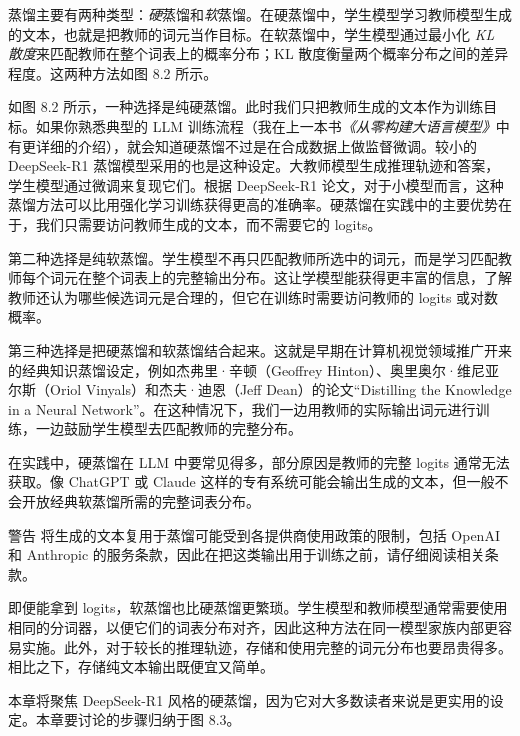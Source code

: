 蒸馏主要有两种类型：\emph{硬}蒸馏和\emph{软}蒸馏。在硬蒸馏中，学生模型学习教师模型生成的文本，也就是把教师的词元当作目标。在软蒸馏中，学生模型通过最小化 \emph{KL 散度}来匹配教师在整个词表上的概率分布；KL 散度衡量两个概率分布之间的差异程度。这两种方法如图 8.2 所示。


如图 8.2 所示，一种选择是纯硬蒸馏。此时我们只把教师生成的文本作为训练目标。如果你熟悉典型的 LLM 训练流程（我在上一本书\emph{《从零构建大语言模型》}中有更详细的介绍），就会知道硬蒸馏不过是在合成数据上做监督微调。较小的 DeepSeek-R1 蒸馏模型采用的也是这种设定。大教师模型生成推理轨迹和答案，学生模型通过微调来复现它们。根据 DeepSeek-R1 论文，对于小模型而言，这种蒸馏方法可以比用强化学习训练获得更高的准确率。硬蒸馏在实践中的主要优势在于，我们只需要访问教师生成的文本，而不需要它的 logits。

第二种选择是纯软蒸馏。学生模型不再只匹配教师所选中的词元，而是学习匹配教师每个词元在整个词表上的完整输出分布。这让学模型能获得更丰富的信息，了解教师还认为哪些候选词元是合理的，但它在训练时需要访问教师的 logits 或对数概率。

第三种选择是把硬蒸馏和软蒸馏结合起来。这就是早期在计算机视觉领域推广开来的经典知识蒸馏设定，例如杰弗里·辛顿（Geoffrey Hinton）、奥里奥尔·维尼亚尔斯（Oriol Vinyals）和杰夫·迪恩（Jeff Dean）的论文“Distilling the Knowledge in a Neural Network”。在这种情况下，我们一边用教师的实际输出词元进行训练，一边鼓励学生模型去匹配教师的完整分布。

在实践中，硬蒸馏在 LLM 中要常见得多，部分原因是教师的完整 logits 通常无法获取。像 ChatGPT 或 Claude 这样的专有系统可能会输出生成的文本，但一般不会开放经典软蒸馏所需的完整词表分布。

\begin{myWarning}{警告}
 将生成的文本复用于蒸馏可能受到各提供商使用政策的限制，包括 OpenAI 和 Anthropic 的服务条款，因此在把这类输出用于训练之前，请仔细阅读相关条款。\end{myWarning}

即便能拿到 logits，软蒸馏也比硬蒸馏更繁琐。学生模型和教师模型通常需要使用相同的分词器，以便它们的词表分布对齐，因此这种方法在同一模型家族内部更容易实施。此外，对于较长的推理轨迹，存储和使用完整的词元分布也要昂贵得多。相比之下，存储纯文本输出既便宜又简单。

本章将聚焦 DeepSeek-R1 风格的硬蒸馏，因为它对大多数读者来说是更实用的设定。本章要讨论的步骤归纳于图 8.3。

